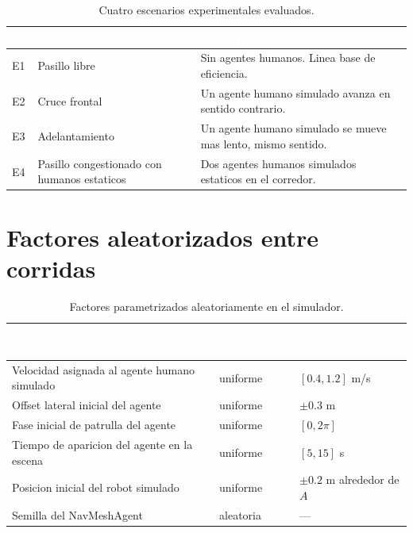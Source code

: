 \documentclass[12pt,a4paper,oneside]{book}
\begin{document}
\begin{table}[H]
\centering
\caption{Cuatro escenarios experimentales evaluados.}
\renewcommand{\arraystretch}{1.4}
\small
\begin{tabular}{llp{7cm}}
\toprule
\rowcolor{primary}
\textcolor{white}{\textbf{ID}} &
\textcolor{white}{\textbf{Nombre}} &
\textcolor{white}{\textbf{Descripcion}} \\
\midrule
E1 & Pasillo libre & Sin agentes humanos. Linea base de eficiencia. \\
E2 & Cruce frontal & Un agente humano simulado avanza en sentido contrario. \\
E3 & Adelantamiento & Un agente humano simulado se mueve mas lento, mismo sentido. \\
E4 & Pasillo congestionado con humanos estaticos & Dos agentes humanos simulados estaticos en el corredor. \\
\bottomrule
\end{tabular}
\end{table}

\section{Factores aleatorizados entre corridas}

\begin{table}[H]
\centering
\caption{Factores parametrizados aleatoriamente en el simulador.}
\renewcommand{\arraystretch}{1.3}
\small
\begin{tabular}{lll}
\toprule
\rowcolor{primary}
\textcolor{white}{\textbf{Factor del simulador}} &
\textcolor{white}{\textbf{Distribucion}} &
\textcolor{white}{\textbf{Rango configurado}} \\
\midrule
Velocidad asignada al agente humano simulado & uniforme & $[0.4, 1.2]$ m/s \\
Offset lateral inicial del agente             & uniforme & $\pm 0.3$ m \\
Fase inicial de patrulla del agente           & uniforme & $[0, 2\pi]$ \\
Tiempo de aparicion del agente en la escena   & uniforme & $[5, 15]$ s \\
Posicion inicial del robot simulado           & uniforme & $\pm 0.2$ m alrededor de $A$ \\
Semilla del NavMeshAgent                      & aleatoria & --- \\
\bottomrule
\end{tabular}
\end{table}
\end{document}

